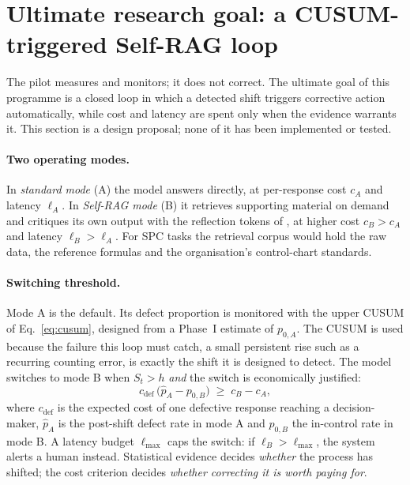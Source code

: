 \documentclass[11pt]{article}
\begin{document}
\section{Ultimate research goal: a CUSUM-triggered Self-RAG loop}\label{sec:goal}
The pilot measures and monitors; it does not correct. The ultimate goal of this programme is a closed loop in which a detected shift triggers corrective action automatically, while cost and latency are spent only when the evidence warrants it. This section is a design proposal; none of it has been implemented or tested.

\paragraph{Two operating modes.} In \emph{standard mode} (A) the model answers directly, at per-response cost $c_A$ and latency $\ell_A$. In \emph{Self-RAG mode} (B) it retrieves supporting material on demand and critiques its own output with the reflection tokens of \citet{asai2024selfrag}, at higher cost $c_B>c_A$ and latency $\ell_B>\ell_A$. For SPC tasks the retrieval corpus would hold the raw data, the reference formulas and the organisation's control-chart standards.

\paragraph{Switching threshold.} Mode A is the default. Its defect proportion is monitored with the upper CUSUM of Eq.~\ref{eq:cusum}, designed from a Phase~I estimate of $p_{0,A}$. The CUSUM is used because the failure this loop must catch, a small persistent rise such as a recurring counting error, is exactly the shift it is designed to detect. The model switches to mode B when $S_t>h$ \emph{and} the switch is economically justified:
\begin{equation}
c_{\mathrm{def}}\,\bigl(\hat p_A-p_{0,B}\bigr)\;\ge\;c_B-c_A,
\label{eq:switch}
\end{equation}
where $c_{\mathrm{def}}$ is the expected cost of one defective response reaching a decision-maker, $\hat p_A$ is the post-shift defect rate in mode A and $p_{0,B}$ the in-control rate in mode B. A latency budget $\ell_{\max}$ caps the switch: if $\ell_B>\ell_{\max}$, the system alerts a human instead. Statistical evidence decides \emph{whether} the process has shifted; the cost criterion decides \emph{whether correcting it is worth paying for}.
\end{document}
